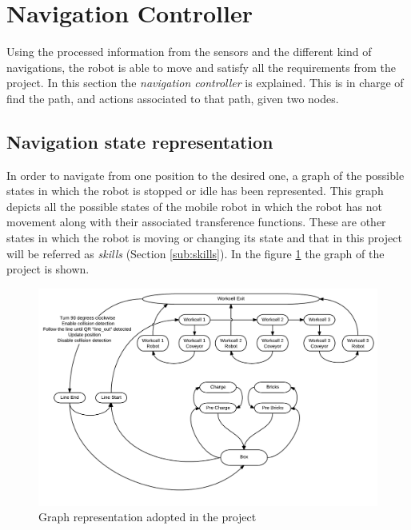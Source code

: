 \section{Navigation Controller} %
\label{sec:mr_navigation_controller}
Using the processed information from the sensors and the different kind of navigations, the robot is able to move and satisfy all the requirements from the project.
In this section the \emph{navigation controller} is explained.
This is in charge of find the path, and actions associated to that path, given two nodes.

\subsection{Navigation state representation} %
    \label{sub:mr_navigation_state_representation}
    In order to navigate from one position to the desired one, a graph of the possible states in which the robot is stopped or idle has been represented.
    This graph depicts all the possible states of the mobile robot in which the robot has not movement along with their associated transference functions. 
    These are other states in which the robot is moving or changing its state and that in this project will be referred as \emph{skills} (Section \ref{sub:skills}).
    In the figure \ref{fig:mr_graph} the graph of the project is shown.
    
    \begin{figure}[ht!]
        \centering
        \includegraphics[width=\textwidth]{figs/mr_graph.pdf}
        \caption{Graph representation adopted in the project}
        \label{fig:mr_graph}
    \end{figure}

